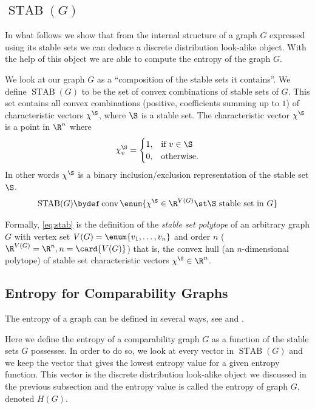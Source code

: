 \subsection{$\operatorname{STAB}(G)$}
\label{tree:poset:graph:stab}

In what follows we show that from the internal structure of a graph $G$
expressed using its stable sets we can deduce a discrete distribution
look-alike object. With the help of this object we are able to compute the
entropy of the graph $G$.

We look at our graph $G$ as a ``composition of the
stable sets it contains''. We define $\operatorname{STAB}(G)$ to be the set of convex
combinations of stable sets of $G$.
This set contains all convex combinations (positive,
coefficients summing up to $1$) of characteristic vectors $\chi^{\S}$, where $\S$
is a stable set. The characteristic vector $\chi^{\S}$ is a point in $\R^n$ where
\begin{displaymath}
\chi^{\S}_v =\begin{cases}
      1, & \text{if}\ v \in \S\\
      0, & \text{otherwise}.
    \end{cases}
\end{displaymath}
In other words $\chi^{\S}$ is a binary inclusion/exclusion representation of the
stable set $\S$.
\begin{equation}
\operatorname{STAB}(G) \bydef \operatorname{conv}\enum{\chi^{\S} \in \R^{V(G)} \st
\S\text{ stable set in }G}
\label{eq:stab}
\end{equation}

Formally, \ref{eq:stab} is the definition of the \emph{stable set polytope} of
an arbitrary graph $G$ with vertex set $V(G) = \enum{v_1, \ldots, v_n }$
and order $n$ ($\R^{V(G)} = \R^n, n = \card{V(G)}$) that is, the convex hull (an $n$-dimensional
polytope) of stable set characteristic vectors $\chi^{\S} \in \R^n$.



\subsection{Entropy for Comparability Graphs}

The entropy of a graph can be defined in several ways, see
\citet*{mowshowitz2012entropy} and \citet*{simonyi1995graph}.

Here we define the entropy of a comparability graph $G$ as a function of the
stable sets $G$ possesses. In order to do so, we look at every vector in
$\operatorname{STAB}(G)$ and we keep the vector that gives the lowest entropy
value for a given entropy function. This vector is the discrete distribution
look-alike object we discussed in the previous subsection and the
entropy value is called the entropy of graph $G$, denoted ${H}(G)$.

